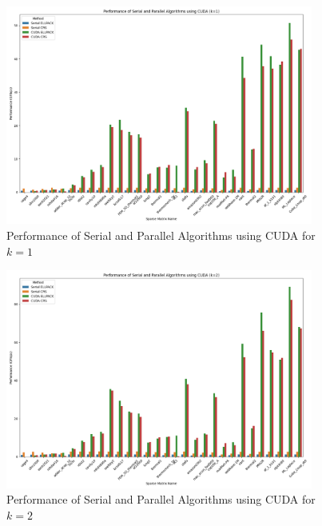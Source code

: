 \documentclass[12pt,oneside]{book} %
\begin{document}
\newpage
\begin{figure}[H]
    \centering
    \includegraphics[width=0.9\textwidth]{../results/images/CUDA_Performance_k1.png}
    \caption{Performance of Serial and Parallel Algorithms using CUDA for $k=1$}
    \label{fig:cuda-performance-k1}
\end{figure}

\begin{figure}[H]
    \centering
    \includegraphics[width=0.9\textwidth]{../results/images/CUDA_Performance_k2.png}
    \caption{Performance of Serial and Parallel Algorithms using CUDA for $k=2$}
    \label{fig:cuda-performance-k2}
\end{figure}
\end{document}
